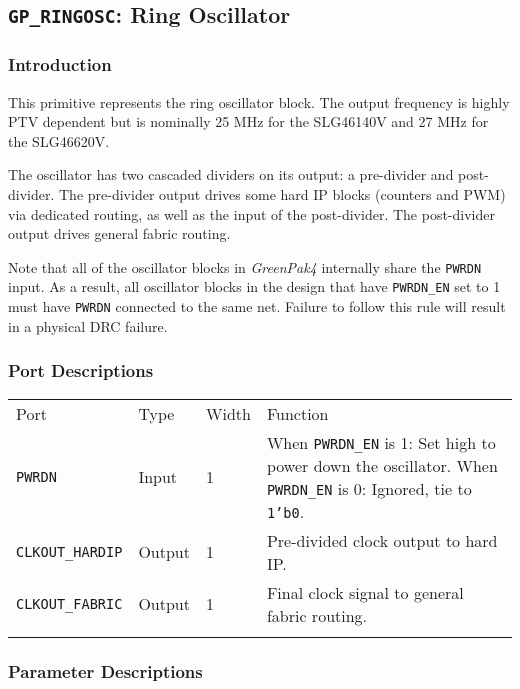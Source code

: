 \documentclass[11pt]{article}
\newcommand{\namestyle}[1]{\textit{#1}}
\newcommand{\tokenstyle}[1]{\texttt{#1}}
\newcommand{\datastyle}[1]{\texttt{#1}}
\newcommand{\whenstyle}[1]{{\fontseries{sb}\selectfont#1}}
\newcommand{\thinhline}{\Xhline{1\arrayrulewidth}}
\newcommand{\thickhline}{\Xhline{2.5\arrayrulewidth}}
\begin{document}
\pagebreak
\subsection{\tokenstyle{GP\_RINGOSC}: Ring Oscillator}
\label{gp-ringosc}

\subsubsection{Introduction}
This primitive represents the ring oscillator block. The output frequency is highly PTV dependent but is nominally 25
MHz for the SLG46140V and 27 MHz for the SLG46620V.

The oscillator has two cascaded dividers on its output: a pre-divider and post-divider. The pre-divider output drives
some hard IP blocks (counters and PWM) via dedicated routing, as well as the input of the post-divider. The
post-divider output drives general fabric routing.

Note that all of the oscillator blocks in \namestyle{GreenPak4} internally share the \tokenstyle{PWRDN} input. As a result, all oscillator
blocks in the design that have \tokenstyle{PWRDN\_EN} set to 1 must have \tokenstyle{PWRDN} connected to the same net. Failure to follow this
rule will result in a physical DRC failure.

\subsubsection{Port Descriptions}

\begin{tabularx}{\textwidth}{lllX}
\thinhline
\whenstyle{Port} & \whenstyle{Type} & \whenstyle{Width} & \whenstyle{Function} \\
\thickhline
\tokenstyle{PWRDN} & Input & 1 &
	\whenstyle{When \tokenstyle{PWRDN\_EN} is 1:} Set high to power down the oscillator. \newline
	\whenstyle{When \tokenstyle{PWRDN\_EN} is 0:} Ignored, tie to \datastyle{1'b0}.\\
\thinhline
\tokenstyle{CLKOUT\_HARDIP} & Output & 1 & Pre-divided clock output to hard IP. \\
\thinhline
\tokenstyle{CLKOUT\_FABRIC} & Output & 1 & Final clock signal to general fabric routing. \\
\thinhline
\end{tabularx}

\subsubsection{Parameter Descriptions}
\end{document}
